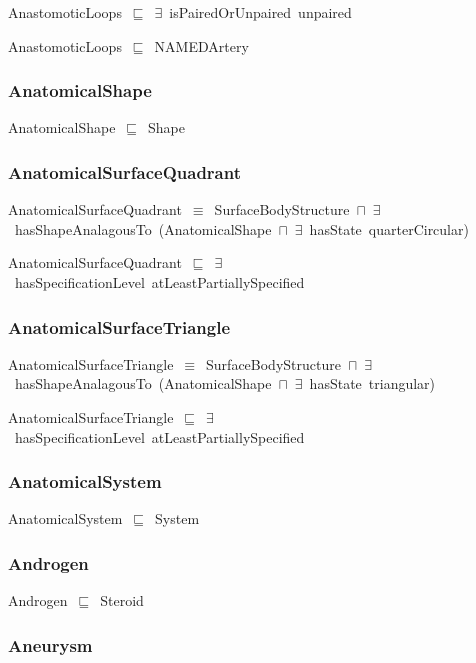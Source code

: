 \documentclass{article}
\begin{document}
AnastomoticLoops~\ensuremath{\sqsubseteq}~\ensuremath{\exists}~isPairedOrUnpaired~unpaired~

AnastomoticLoops~\ensuremath{\sqsubseteq}~NAMEDArtery~

\subsubsection*{AnatomicalShape}

AnatomicalShape~\ensuremath{\sqsubseteq}~Shape~

\subsubsection*{AnatomicalSurfaceQuadrant}

AnatomicalSurfaceQuadrant~\ensuremath{\equiv}~SurfaceBodyStructure~\ensuremath{\sqcap}~\ensuremath{\exists}~hasShapeAnalagousTo~(AnatomicalShape~\ensuremath{\sqcap}~\ensuremath{\exists}~hasState~quarterCircular)

AnatomicalSurfaceQuadrant~\ensuremath{\sqsubseteq}~\ensuremath{\exists}~hasSpecificationLevel~atLeastPartiallySpecified~

\subsubsection*{AnatomicalSurfaceTriangle}

AnatomicalSurfaceTriangle~\ensuremath{\equiv}~SurfaceBodyStructure~\ensuremath{\sqcap}~\ensuremath{\exists}~hasShapeAnalagousTo~(AnatomicalShape~\ensuremath{\sqcap}~\ensuremath{\exists}~hasState~triangular)

AnatomicalSurfaceTriangle~\ensuremath{\sqsubseteq}~\ensuremath{\exists}~hasSpecificationLevel~atLeastPartiallySpecified~

\subsubsection*{AnatomicalSystem}

AnatomicalSystem~\ensuremath{\sqsubseteq}~System~

\subsubsection*{Androgen}

Androgen~\ensuremath{\sqsubseteq}~Steroid~

\subsubsection*{Aneurysm}
\end{document}
